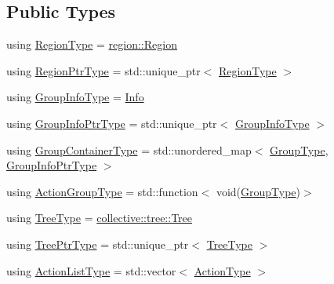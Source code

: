 \subsection*{Public Types}
\begin{DoxyCompactItemize}
\item 
using \hyperlink{structvt_1_1group_1_1_group_manager_a38876227e6077059a67a5d5e5647d8a3}{Region\+Type} = \hyperlink{structvt_1_1group_1_1region_1_1_region}{region\+::\+Region}
\item 
using \hyperlink{structvt_1_1group_1_1_group_manager_a9192e585fc2f99bfd5a6ff65fc21c40b}{Region\+Ptr\+Type} = std\+::unique\+\_\+ptr$<$ \hyperlink{structvt_1_1group_1_1_group_manager_a38876227e6077059a67a5d5e5647d8a3}{Region\+Type} $>$
\item 
using \hyperlink{structvt_1_1group_1_1_group_manager_a556f65e569f3e3f2dfc4a247e137b409}{Group\+Info\+Type} = \hyperlink{structvt_1_1group_1_1_info}{Info}
\item 
using \hyperlink{structvt_1_1group_1_1_group_manager_adedebd6e550efd2bee5bb118f816b2e0}{Group\+Info\+Ptr\+Type} = std\+::unique\+\_\+ptr$<$ \hyperlink{structvt_1_1group_1_1_group_manager_a556f65e569f3e3f2dfc4a247e137b409}{Group\+Info\+Type} $>$
\item 
using \hyperlink{structvt_1_1group_1_1_group_manager_a9e2a0989865f4097bb5edd390865555e}{Group\+Container\+Type} = std\+::unordered\+\_\+map$<$ \hyperlink{namespacevt_a27b5e4411c9b6140c49100e050e2f743}{Group\+Type}, \hyperlink{structvt_1_1group_1_1_group_manager_adedebd6e550efd2bee5bb118f816b2e0}{Group\+Info\+Ptr\+Type} $>$
\item 
using \hyperlink{structvt_1_1group_1_1_group_manager_ae871c5871ad62b530220009c1ee4d4b9}{Action\+Group\+Type} = std\+::function$<$ void(\hyperlink{namespacevt_a27b5e4411c9b6140c49100e050e2f743}{Group\+Type})$>$
\item 
using \hyperlink{structvt_1_1group_1_1_group_manager_a33ca642d5f42e39f033ed4f62613caef}{Tree\+Type} = \hyperlink{structvt_1_1collective_1_1tree_1_1_tree}{collective\+::tree\+::\+Tree}
\item 
using \hyperlink{structvt_1_1group_1_1_group_manager_a9e0bcb0f3241a19b95d4f7fa092f4c8e}{Tree\+Ptr\+Type} = std\+::unique\+\_\+ptr$<$ \hyperlink{structvt_1_1group_1_1_group_manager_a33ca642d5f42e39f033ed4f62613caef}{Tree\+Type} $>$
\item 
using \hyperlink{structvt_1_1group_1_1_group_manager_a48b2dd05bbdda19c5d6195b8932a2716}{Action\+List\+Type} = std\+::vector$<$ \hyperlink{namespacevt_ae0a5a7b18cc99d7b732cb4d44f46b0f3}{Action\+Type} $>$

\end{DoxyCompactItemize}
